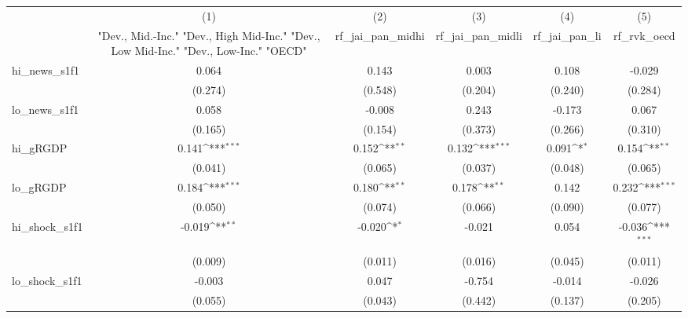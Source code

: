 {
\def\sym#1{\ifmmode^{#1}\else\(^{#1}\)\fi}
\begin{tabular}{l*{5}{c}}
\toprule
            &\multicolumn{1}{c}{(1)}&\multicolumn{1}{c}{(2)}&\multicolumn{1}{c}{(3)}&\multicolumn{1}{c}{(4)}&\multicolumn{1}{c}{(5)}\\
            &\multicolumn{1}{c}{ "Dev., Mid.-Inc." "Dev., High Mid-Inc." "Dev., Low Mid-Inc." "Dev., Low-Inc." "OECD" }&\multicolumn{1}{c}{rf\_jai\_pan\_midhi}&\multicolumn{1}{c}{rf\_jai\_pan\_midli}&\multicolumn{1}{c}{rf\_jai\_pan\_li}&\multicolumn{1}{c}{rf\_rvk\_oecd}\\
\midrule
hi\_news\_s1f1&       0.064         &       0.143         &       0.003         &       0.108         &      -0.029         \\
            &     (0.274)         &     (0.548)         &     (0.204)         &     (0.240)         &     (0.284)         \\
\addlinespace
lo\_news\_s1f1&       0.058         &      -0.008         &       0.243         &      -0.173         &       0.067         \\
            &     (0.165)         &     (0.154)         &     (0.373)         &     (0.266)         &     (0.310)         \\
\addlinespace
hi\_gRGDP    &       0.141\sym{***}&       0.152\sym{**} &       0.132\sym{***}&       0.091\sym{*}  &       0.154\sym{**} \\
            &     (0.041)         &     (0.065)         &     (0.037)         &     (0.048)         &     (0.065)         \\
\addlinespace
lo\_gRGDP    &       0.184\sym{***}&       0.180\sym{**} &       0.178\sym{**} &       0.142         &       0.232\sym{***}\\
            &     (0.050)         &     (0.074)         &     (0.066)         &     (0.090)         &     (0.077)         \\
\addlinespace
hi\_shock\_s1f1&      -0.019\sym{**} &      -0.020\sym{*}  &      -0.021         &       0.054         &      -0.036\sym{***}\\
            &     (0.009)         &     (0.011)         &     (0.016)         &     (0.045)         &     (0.011)         \\
\addlinespace
lo\_shock\_s1f1&      -0.003         &       0.047         &      -0.754         &      -0.014         &      -0.026         \\
            &     (0.055)         &     (0.043)         &     (0.442)         &     (0.137)         &     (0.205)         \\

\end{tabular}}
